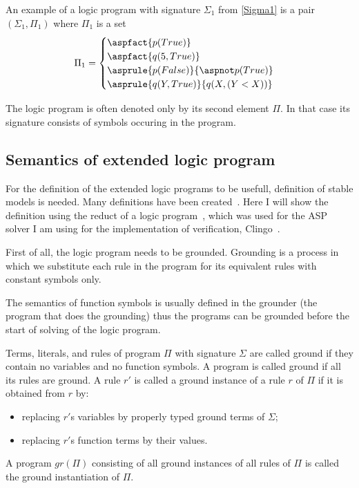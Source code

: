 \begin{example}\label{exp:logic_program1}
    An example of a logic program with signature $\Sigma_1$ from \cref{Sigma1}
    is a pair $(\Sigma_1, \Pi_1)$ where $\Pi_1$ is a set
    \begin{equation*}
        \Pi_1 =
            \begin{cases}
                \aspfact{p(True)}\\
                \aspfact{q(5, True)}\\
                \asprule{p(False)}{\aspnot p(True)}\\
                \asprule{q(Y, True)}{q(X, (Y < X))}
            \end{cases}
    \end{equation*}
\end{example}

The logic program is often denoted only by its second element $\Pi$.
In that case its signature consists of symbols occuring in the program.


\subsection{Semantics of extended logic program}

For the definition of the extended logic programs to be usefull,
definition of stable models is needed.
Many definitions have been created~\cite{12definitions}.
Here I will show the definition using the reduct
of a logic program~\cite{KRHandbook},
which was used for the ASP solver I am using for the implementation
of verification, Clingo~\cite{GebserKKS17}.

First of all, the logic program needs to be grounded.
Grounding is a process in which we substitute each rule
in the program for its equivalent rules with constant symbols only.

The semantics of function symbols is usually defined in the groun\-d\-er
(the program that does the grounding)
thus the programs can be grounded before the start of solving
of the logic program.

\begin{definition}
    Terms, literals, and rules of program $\Pi$ with signature $\Sigma$ are called ground if they
    contain no variables and no function symbols. A program is called
    ground if all its rules are ground. A rule $r'$ is called a ground instance of a rule $r$ of $\Pi$
    if it is obtained from $r$ by:
    \begin{itemize}
        \item replacing $r'$s variables by properly typed ground terms of $\Sigma$;
        \item replacing $r'$s function terms by their values.
    \end{itemize}
    A program $gr(\Pi)$ consisting of all ground instances of all rules of $\Pi$
    is called the ground instantiation of $\Pi$.
\end{definition}


